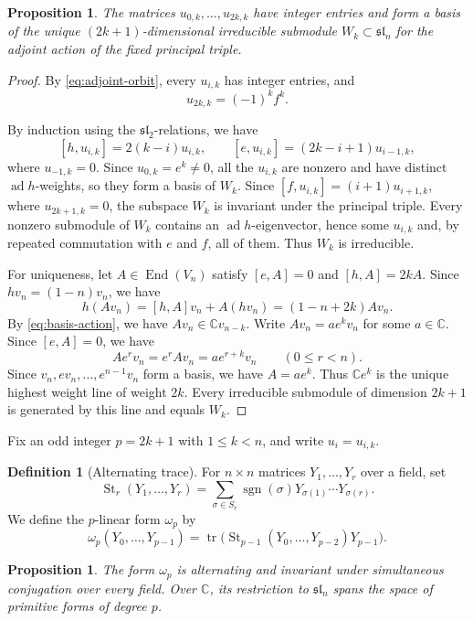 \documentclass[12pt]{article}
\newtheorem{proposition}[theorem]{Proposition}
\theoremstyle{definition}
\newtheorem{definition}[theorem]{Definition}
\theoremstyle{remark}
\DeclareMathOperator{\St}{St}
\DeclareMathOperator{\ad}{ad}
\DeclareMathOperator{\tr}{tr}
\DeclareMathOperator{\sgn}{sgn}
\DeclareMathOperator{\End}{End}
\newcommand{\C}{\mathbb C}
\begin{document}
\begin{proposition}\label{prop:principal-module}
The matrices $u_{0,k},\ldots,u_{2k,k}$ have integer entries and form
a basis of the unique $(2k+1)$-dimensional irreducible submodule
$W_k\subset\mathfrak{sl}_n$ for the adjoint action of the fixed
principal triple.
\end{proposition}

\begin{proof}
By \eqref{eq:adjoint-orbit}, every $u_{i,k}$ has integer entries, and
\[
 u_{2k,k}=(-1)^kf^k.
\]

By induction using the $\mathfrak{sl}_2$-relations, we have
\begin{equation}\label{eq:string}
 [h,u_{i,k}]=2(k-i)u_{i,k},\qquad
 [e,u_{i,k}]=(2k-i+1)u_{i-1,k},
\end{equation}
where $u_{-1,k}=0$. Since $u_{0,k}=e^k\neq0$, all the $u_{i,k}$ are
nonzero and have distinct $\ad h$-weights, so they form a basis of $W_k$.
Since $[f,u_{i,k}]=(i+1)u_{i+1,k}$, where $u_{2k+1,k}=0$,
the subspace $W_k$ is invariant under the principal triple.
Every nonzero submodule of $W_k$ contains an $\ad h$-eigenvector,
hence some $u_{i,k}$ and, by repeated commutation with $e$ and $f$,
all of them. Thus $W_k$ is irreducible.

For uniqueness, let $A\in\End(V_n)$ satisfy $[e,A]=0$ and
$[h,A]=2kA$. Since $hv_n=(1-n)v_n$, we have
\[
 h(Av_n)=[h,A]v_n+A(hv_n)=(1-n+2k)Av_n.
\]
By \eqref{eq:basis-action}, we have $Av_n\in\C v_{n-k}$.
Write $Av_n=a e^kv_n$ for some $a\in\C$. Since $[e,A]=0$, we have
\[
 Ae^rv_n=e^rAv_n=a e^{r+k}v_n\qquad(0\leq r<n).
\]
Since $v_n,ev_n,\ldots,e^{n-1}v_n$ form a basis, we have $A=ae^k$.
Thus $\C e^k$ is the unique highest weight line of weight $2k$.
Every irreducible submodule of dimension $2k+1$ is generated by
this line and equals $W_k$.
\end{proof}

Fix an odd integer $p=2k+1$ with $1\leq k<n$, and write $u_i=u_{i,k}$.

\begin{definition}[Alternating trace]\label{def:alternating-trace}
For $n\times n$ matrices $Y_1,\ldots,Y_r$ over a field, set
\[
 \St_r(Y_1,\ldots,Y_r)
 =\sum_{\sigma\in S_r}\sgn(\sigma)Y_{\sigma(1)}\cdots Y_{\sigma(r)}.
\]
We define the $p$-linear form $\omega_p$ by
\[
 \omega_p(Y_0,\ldots,Y_{p-1})
 =\tr\bigl(\St_{p-1}(Y_0,\ldots,Y_{p-2})Y_{p-1}\bigr).
\]
\end{definition}

\begin{proposition}\label{prop:primitive-form}
The form $\omega_p$ is alternating and invariant under simultaneous
conjugation over every field. Over $\C$, its restriction to
$\mathfrak{sl}_n$ spans the space of primitive forms of degree $p$.
\end{proposition}
\end{document}
